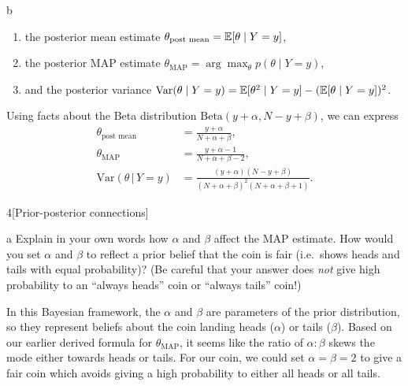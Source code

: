 \documentclass[expanded]{lkx_pset}
\begin{document}
\begin{solution}
\begin{solution}
\begin{part}{b}
			\begin{enumerate}
				\item the posterior mean estimate \(\theta_{\text{post mean}} = \operatorname*{\mathbb{E}} [\theta \mid Y = y]\),
				\item the posterior MAP estimate \(\theta_{\text{MAP}}=\arg \max_{\theta}p(\theta \mid Y=y)\),
				\item and the posterior variance $\mathrm{Var}(\theta \mid Y = y) = \operatorname*{\mathbb{E}}[\theta^2 \mid Y = y] - (\operatorname*{\mathbb{E}}[\theta \mid Y = y])^2$.
			\end{enumerate}
		\end{part}

		Using facts about the Beta distribution $\textrm{Beta}(y+\alpha, N-y+\beta)$, we can express
		\[
			\begin{aligned}
				\theta_{\textrm{post mean}}   & = \frac{y+\alpha}{N+\alpha+\beta},                                    \\
				\theta_{\textrm{MAP}}         & = \frac{y+\alpha-1}{N+\alpha+\beta-2},                                \\
				\textrm{Var}(\theta\,|\, Y=y) & = \frac{(y+\alpha)(N-y+\beta)}{(N+\alpha+\beta)^2(N+\alpha+\beta+1)}.
			\end{aligned}
		\]
	\end{solution}

	\begin{part}{4}[Prior-posterior connections]
	\end{part}
	\begin{parts}
		\begin{part}{a}
			Explain in your own words how \(\alpha\) and \(\beta\) affect the
			MAP estimate. How would you set \(\alpha\) and \(\beta\) to reflect
			a prior belief that the coin is fair (i.e.~shows heads and tails
			with equal probability)? (Be careful that your answer does \emph{not} give high probability to an ``always heads'' coin or ``always tails'' coin!)
		\end{part}

		In this Bayesian framework, the $\alpha$ and $\beta$ are parameters of the prior distribution, so they represent beliefs about the coin landing heads ($\alpha$) or tails ($\beta$). Based on our earlier derived formula for $\theta_{\textrm{MAP}}$, it seems like the ratio of $\alpha : \beta$ skews the mode either towards heads or tails. For our coin, we could set $\alpha=\beta=2$ to give a fair coin which avoids giving a high probability to either all heads or all tails.


\end{parts}
\end{solution}
\end{document}
